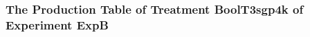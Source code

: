  \begin{frame}
 \fontsize{8pt}{9pt}\selectfont
 \frametitle{ The Production Table of Treatment BoolT3sgp4k of Experiment ExpB }

 \label{ExpBGrammarTable021.tex}  
 \end{frame}

